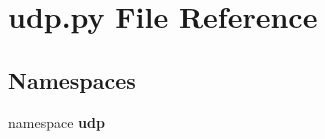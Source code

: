 \section{udp.py File Reference}
\label{udp_8py}
\subsection*{Namespaces}
\begin{CompactItemize}
\item 
namespace {\bf udp}
\end{CompactItemize}
